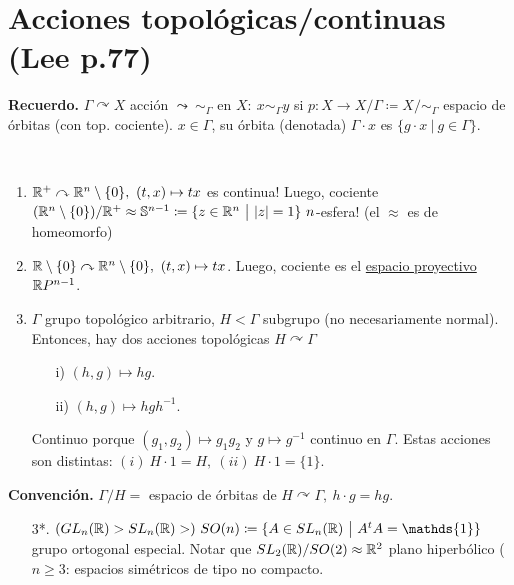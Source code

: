 \section{Acciones topológicas/continuas (Lee p.77)}

\textbf{Recuerdo.} $\Gamma \curvearrowright X$ acción $\leadsto \ \sim_{\Gamma}$ en $X: \ x \sim_{\Gamma} y$ si $p: X \to X / \Gamma \coloneq X / \sim_{\Gamma}$ espacio de órbitas (con top. cociente). $x \in \Gamma $, su órbita (denotada) $\Gamma \cdot x$ es $\{g \cdot x \ \big| \ g \in \Gamma \}$. \newline

\begin{eg}~
	\begin{enumerate}
		\item $\mathbb{R}^+ \curvearrowright \mathbb{R}^n \setminus \{0\},\ (t,x) \mapsto tx$ es continua! Luego, cociente $(\R^n \setminus \{0\}) / \R^+ \approx \mathbb{S}^{n-1} \coloneq \{z \in \R^n \ \big| \ |z| = 1\}\ n$-esfera! (el $\approx$ es de homeomorfo)   

		\item $\mathbb{R} \setminus \{0\}  \curvearrowright \mathbb{R}^n \setminus \{0\},\ (t,x) \mapsto tx$. Luego, cociente es el \underline{espacio proyectivo}  $\mathbb{R} P^{n-1}$.

		\item $\Gamma$ grupo topológico arbitrario, $H < \Gamma $ subgrupo (no necesariamente normal). Entonces, hay dos acciones topológicas $H \curvearrowright \Gamma$
		\begin{enumerate}
			\item[i)] $(h,g) \mapsto hg$.

			\item[ii)] $(h,g) \mapsto hgh^{-1}$.
		\end{enumerate}
		 Continuo porque $(g_{1},g_{2}) \mapsto g_{1}g_{2}$ y $g \mapsto g^{-1}$ continuo en $\Gamma$. Estas acciones son distintas: $(i) \ H \cdot 1 = H,\ (ii) \ H \cdot 1 = \{1\}$.  
	\end{enumerate}
	\textbf{Convención.} $\Gamma / H =$ espacio de órbitas de $H \curvearrowright \Gamma ,\ h\cdot g = hg$.

	\begin{enumerate}
		\item[3*.] $(GL_n(\R)>SL_n(\R)>)\ SO(n) \coloneq \{ A \in SL_n(\R) \ \big| \ A^t A  = \mathds{1} \}$ grupo ortogonal especial. Notar que $SL_2(\mathbb{R}) / SO(2) \approx \mathbb{R}^2$ plano hiperbólico ($n\geq 3$: espacios simétricos de tipo no compacto.
	\end{enumerate}
\end{eg}

